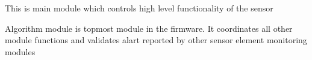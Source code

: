 This is main module which controls high level functionality of the sensor

Algorithm module is topmost module in the firmware. It coordinates all other module functions and validates alart reported by other sensor element monitoring modules 